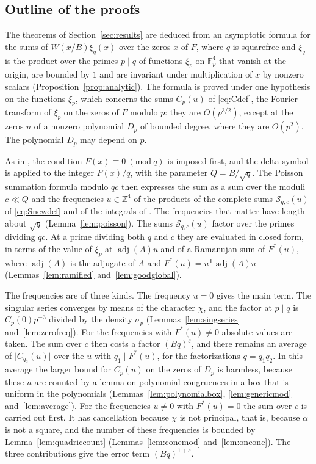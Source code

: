 \documentclass[11pt]{amsart}
\numberwithin{equation}{section}
\numberwithin{figure}{section}
\theoremstyle{definition}
\newcommand{\Z}{\mathbb{Z}}
\newcommand{\imod}[1]{\ (\mathrm{mod}\ #1)}
\newcommand{\eps}{\varepsilon}
\newcommand{\abs}[1]{\lvert #1\rvert}
\newcommand{\Fp}{\mathbb F_p}
\newcommand{\adj}{\operatorname{adj}}
\begin{document}
\subsection{Outline of the proofs}\label{sec:outline}

The theorems of Section~\ref{sec:results} are deduced from an
asymptotic formula for the sums of $W(x/B)\xi_q(x)$ over the zeros
$x$ of $F$, where $q$ is squarefree and $\xi_q$ is the product over
the primes $p\mid q$ of
functions $\xi_p$ on $\Fp^4$ that vanish at the origin, are bounded
by $1$ and are invariant under multiplication of $x$ by nonzero
scalars (Proposition~\ref{prop:analytic}). The formula is proved
under one hypothesis on the functions $\xi_p$, which concerns the
sums $C_p(u)$ of \eqref{eq:Cdef}, the Fourier transform of $\xi_p$
on the zeros of $F$ modulo $p$: they are $O(p^{3/2})$, except at the
zeros $u$ of a
nonzero polynomial $D_p$ of bounded degree, where they are $O(p^2)$.
The polynomial $D_p$ may depend on $p$.

As in \cite{M}, the condition $F(x)\equiv0\imod q$ is imposed first,
and the delta symbol is applied to the integer $F(x)/q$, with the
parameter $Q=B/\sqrt q$. The Poisson summation formula modulo $qc$
then expresses the sum as a sum over the moduli $c\ll Q$ and the
frequencies $u\in\Z^4$ of the products of the complete sums
$\mathcal S_{q,c}(u)$ of \eqref{eq:Snewdef} and of the integrals of
\cite{HB}. The
frequencies that matter have length about $\sqrt q$
(Lemma~\ref{lem:poisson}). The sums $\mathcal S_{q,c}(u)$ factor
over the primes dividing $qc$. At a prime dividing both $q$ and $c$
they are
evaluated in closed form, in terms of the value of $\xi_p$ at
$\adj(A)u$ and of a Ramanujan sum of $F^*(u)$, where $\adj(A)$ is the
adjugate of $A$ and $F^*(u)=u^{\mathsf T}\adj(A)u$
(Lemmas~\ref{lem:ramified} and~\ref{lem:goodglobal}).

The frequencies are of three kinds. The frequency $u=0$ gives the
main term. The singular series converges by means of the character
$\chi$, and the factor at $p\mid q$ is
$C_p(0)p^{-3}$ divided by the density $\sigma_p$
(Lemmas~\ref{lem:singseries} and~\ref{lem:zerofreq}). For the
frequencies with $F^*(u)\ne0$ absolute values are taken. The sum over
$c$ then costs a factor $(Bq)^\eps$, and there remains an average of
$\abs{C_{q_2}(u)}$ over the $u$ with $q_1\mid F^*(u)$, for the
factorizations $q=q_1q_2$. In this average the larger bound for
$C_p(u)$ on the zeros of $D_p$ is harmless, because these $u$ are
counted by a lemma on polynomial congruences in a box that is
uniform in the polynomials (Lemmas~\ref{lem:polynomialbox},
\ref{lem:genericmod} and~\ref{lem:average}). For the frequencies
$u\ne0$ with $F^*(u)=0$ the sum over $c$ is carried out first. It
has cancellation because $\chi$ is not principal, that is, because
$\alpha$ is not a square, and the number of these frequencies is
bounded by Lemma~\ref{lem:quadriccount}
(Lemmas~\ref{lem:conemod} and~\ref{lem:oncone}). The three
contributions give the error term $(Bq)^{1+\eps}$.
\end{document}
